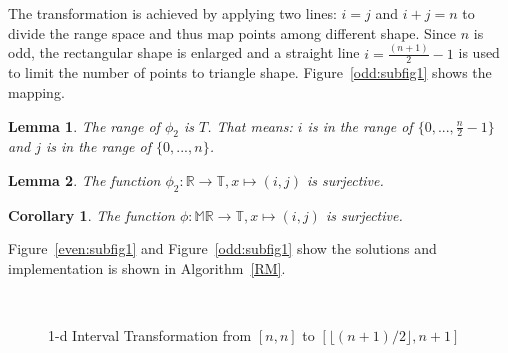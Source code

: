 \documentclass[10pt,journal,cspaper,compsoc]{IEEEtran}
\newtheorem{lemma}{Lemma}
\newtheorem{corollary}[thm]{Corollary}
\begin{document}
The transformation is achieved by applying two lines: $i=j$ and $i+j=n$ to divide the range space and thus map points among different shape. Since $n$ is odd, the rectangular shape is enlarged and a straight line $i= \frac{(n+1)}{2}-1$ is used to limit the number of points to triangle shape. Figure~\ref{odd:subfig1} shows the mapping.
\vspace{5mm}
\begin{lemma}
The range of $\phi_2$ is $T$. That means: $i$ is in the range of  $\{0,...,\frac{n}{2}-1\}$ and $j$ is in the range of $\{0,...,n\}$.
\end{lemma}
\vspace{5mm}
\begin{lemma}
The function $\phi_2:  \mathbb R \rightarrow \mathbb T,x \mapsto (i,j)$ is surjective.
\end{lemma}
\vspace{5mm}
\begin{corollary}
The function $\phi:  \mathbb M \mathbb R \rightarrow \mathbb T,x \mapsto (i,j)$ is surjective.
\end{corollary}


Figure~\ref{even:subfig1} and Figure~\ref{odd:subfig1} show the solutions and implementation is shown in Algorithm~\ref{RM}.

\begin{figure}[h]
\centering
{}
~~
\caption{1-d Interval Transformation from $[n,n]$ to $[\lfloor (n+1)/2 \rfloor,n+1]$}\label{modelBF}
\end{figure}
\end{document}
